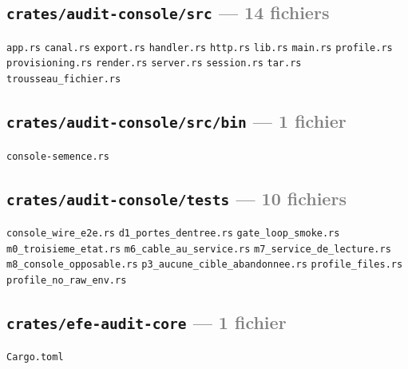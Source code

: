 \documentclass[10pt]{report}
\newcommand{\code}[1]{\texttt{\small #1}}
\begin{document}
\subsection*{\code{crates/audit-console/src} \normalfont\textcolor{grey}{--- 14 fichiers}}
\begin{sloppypar}\footnotesize\raggedright
\code{app.rs} \;\textbullet\; \code{canal.rs} \;\textbullet\; \code{export.rs} \;\textbullet\; \code{handler.rs} \;\textbullet\; \code{http.rs} \;\textbullet\; \code{lib.rs} \;\textbullet\; \code{main.rs} \;\textbullet\; \code{profile.rs} \;\textbullet\; \code{provisioning.rs} \;\textbullet\; \code{render.rs} \;\textbullet\; \code{server.rs} \;\textbullet\; \code{session.rs} \;\textbullet\; \code{tar.rs} \;\textbullet\; \code{trousseau\_fichier.rs}
\end{sloppypar}

\subsection*{\code{crates/audit-console/src/bin} \normalfont\textcolor{grey}{--- 1 fichier}}
\begin{sloppypar}\footnotesize\raggedright
\code{console-semence.rs}
\end{sloppypar}

\subsection*{\code{crates/audit-console/tests} \normalfont\textcolor{grey}{--- 10 fichiers}}
\begin{sloppypar}\footnotesize\raggedright
\code{console\_wire\_e2e.rs} \;\textbullet\; \code{d1\_portes\_dentree.rs} \;\textbullet\; \code{gate\_loop\_smoke.rs} \;\textbullet\; \code{m0\_troisieme\_etat.rs} \;\textbullet\; \code{m6\_cable\_au\_service.rs} \;\textbullet\; \code{m7\_service\_de\_lecture.rs} \;\textbullet\; \code{m8\_console\_opposable.rs} \;\textbullet\; \code{p3\_aucune\_cible\_abandonnee.rs} \;\textbullet\; \code{profile\_files.rs} \;\textbullet\; \code{profile\_no\_raw\_env.rs}
\end{sloppypar}

\subsection*{\code{crates/efe-audit-core} \normalfont\textcolor{grey}{--- 1 fichier}}
\begin{sloppypar}\footnotesize\raggedright
\code{Cargo.toml}
\end{sloppypar}
\end{document}
